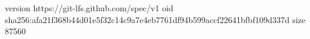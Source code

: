 version https://git-lfs.github.com/spec/v1
oid sha256:afa21f368b44d01e5f32c14c9a7e4eb7761df94b599accf22641bfbf109d337d
size 87560
